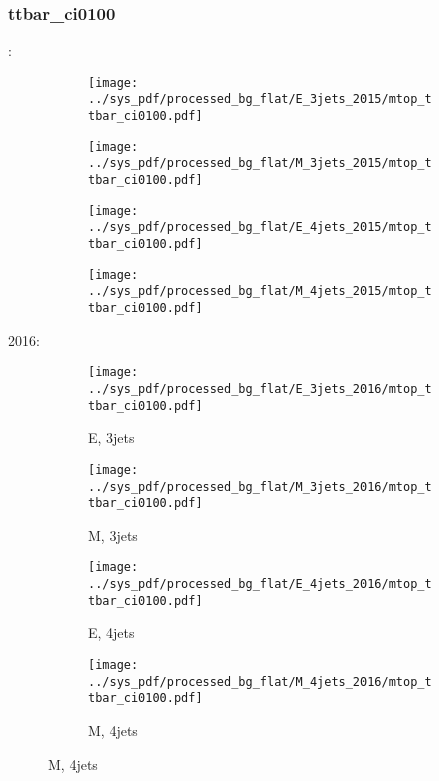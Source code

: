 \documentclass{beamer}
\begin{document}
\begin{frame}
\frametitle{ttbar_ci0100}
\fontsize{5}{1}:
\begin{figure}
\centering
\begin{subfigure}[b]{0.24\textwidth}
\texttt{[image: ../sys\_pdf/processed\_bg\_flat/E\_3jets\_2015/mtop\_ttbar\_ci0100.pdf]}
\end{subfigure}
\begin{subfigure}[b]{0.24\textwidth}
\texttt{[image: ../sys\_pdf/processed\_bg\_flat/M\_3jets\_2015/mtop\_ttbar\_ci0100.pdf]}
\end{subfigure}
\begin{subfigure}[b]{0.24\textwidth}
\texttt{[image: ../sys\_pdf/processed\_bg\_flat/E\_4jets\_2015/mtop\_ttbar\_ci0100.pdf]}
\end{subfigure}
\begin{subfigure}[b]{0.24\textwidth}
\texttt{[image: ../sys\_pdf/processed\_bg\_flat/M\_4jets\_2015/mtop\_ttbar\_ci0100.pdf]}
\end{subfigure}
\end{figure}
2016:
\begin{figure}
\centering
\begin{subfigure}[b]{0.24\textwidth}
\texttt{[image: ../sys\_pdf/processed\_bg\_flat/E\_3jets\_2016/mtop\_ttbar\_ci0100.pdf]}
\captionsetup{font=tiny}
\caption{E, 3jets}
\end{subfigure}
\begin{subfigure}[b]{0.24\textwidth}
\texttt{[image: ../sys\_pdf/processed\_bg\_flat/M\_3jets\_2016/mtop\_ttbar\_ci0100.pdf]}
\captionsetup{font=tiny}
\caption{M, 3jets}
\end{subfigure}
\begin{subfigure}[b]{0.24\textwidth}
\texttt{[image: ../sys\_pdf/processed\_bg\_flat/E\_4jets\_2016/mtop\_ttbar\_ci0100.pdf]}
\captionsetup{font=tiny}
\caption{E, 4jets}
\end{subfigure}
\begin{subfigure}[b]{0.24\textwidth}
\texttt{[image: ../sys\_pdf/processed\_bg\_flat/M\_4jets\_2016/mtop\_ttbar\_ci0100.pdf]}
\captionsetup{font=tiny}
\caption{M, 4jets}
\end{subfigure}
\end{figure}
\end{frame}
\end{document}
